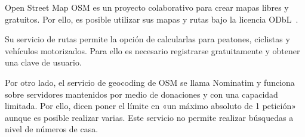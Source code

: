 \begin{definitionlist}
  \item[Open Street Map] \acs{OSM} es un proyecto colaborativo para crear mapas libres y
    gratuitos. Por ello, es posible utilizar sus mapas y rutas bajo la licencia
    ODbL~\cite{LicenciaOSM}.

    Su servicio de rutas permite la opción de calcularlas para peatones, ciclistas y vehículos
    motorizados. Para ello es necesario registrarse gratuitamente y obtener una clave de usuario.

    Por otro lado, el servicio de geocoding de \acs{OSM} se llama Nominatim y funciona sobre
    servidores mantenidos por medio de donaciones y con una capacidad limitada. Por ello, dicen
    poner el límite en «un máximo absoluto de 1 petición»~\cite{Nominatim} aunque es posible
    realizar varias. Este servicio no permite realizar búsquedas a nivel de números de casa.
 
\end{definitionlist}

